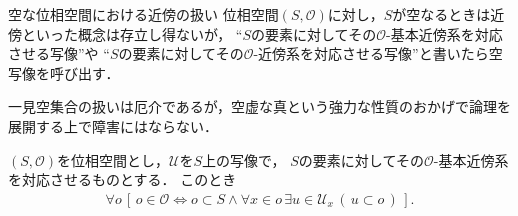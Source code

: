 	\begin{itembox}[l]{空な位相空間における近傍の扱い}
		位相空間$(S,\mathscr{O})$に対し，$S$が空なるときは近傍といった概念は存立し得ないが，
		``$S$の要素に対してその$\mathscr{O}$-基本近傍系を対応させる写像''や
		``$S$の要素に対してその$\mathscr{O}$-近傍系を対応させる写像''と書いたら空写像を呼び出す．
	\end{itembox}
	
	一見空集合の扱いは厄介であるが，空虚な真という強力な性質のおかげで論理を展開する上で障害にはならない．
	
	\begin{screen}
		\begin{thm}[基本近傍系は位相を復元する]
		\label{thm:local_base_defines_open_sets}
			$(S,\mathscr{O})$を位相空間とし，$\mathcal{U}$を$S$上の写像で，
			$S$の要素に対してその$\mathscr{O}$-基本近傍系を対応させるものとする．
			このとき
			\begin{align}
				\forall o\, \left[\, o \in \mathscr{O} \Longleftrightarrow
				o \subset S \wedge \forall x \in o\, \exists u \in \mathcal{U}_{x}\, (\, u \subset o\, )\, \right].
			\end{align}
		\end{thm}
	\end{screen}
	
